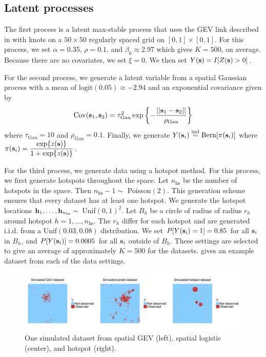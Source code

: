 \subsection{Latent processes} \label{rbs:simsettings}
The first process is a latent max-stable process that uses the GEV link described in  with knots on a $50 \times 50$ regularly spaced grid on $[0, 1] \times [0, 1]$.
For this process, we set $\alpha = 0.35$, $\rho = 0.1$, and $\beta_0 \approx 2.97$ which gives $K = 500$, on average.
Because there are no covariates, we set $\xi = 0$.
We then set $Y(\mathbf{s}) = I[Z(\mathbf{s}) > 0]$.

For the second process, we generate a latent variable from a spatial Gaussian process with a mean of $\text{logit}(0.05) \approx -2.94$ and an exponential covariance given by
\begin{align}
  \text{Cov}(\mathbf{s}_1, \mathbf{s}_2) = \tau_\text{Gau}^2 \exp\left\{- \frac{||\mathbf{s}_1 - \mathbf{s}_2||}{\rho_\text{Gau}}\right\}
\end{align}
where $\tau_\text{Gau} = 10$ and $\rho_\text{Gau} = 0.1$.
Finally, we generate $Y(\mathbf{s}_i) \stackrel{\mathrm{ind}}{\sim} \text{Bern}[\pi(\mathbf{s}_i)]$
where $\pi(\mathbf{s}_i) = \displaystyle \frac{ \exp\{z(\mathbf{s})\}}{1 + \exp\{z(\mathbf{s})\} }$.

For the third process, we generate data using a hotspot method.
For this process, we first generate hotspots throughout the space.
Let $n_\text{hs}$ be the number of hotspots in the space.
Then $n_\text{hs} - 1 \sim$ Poisson$(2)$.
This generation scheme ensures that every dataset has at least one hotspot.
We generate the hotspot locations $\mathbf{h}_1, \ldots, \mathbf{h}_{n_\text{hs}} \sim$ Unif$(0, 1)^2$.
Let $B_h$ be a circle of radius of radius $r_h$ around hotspot $h = 1, \ldots, n_\text{hs}$.
The $r_h$ differ for each hotspot and are generated i.i.d. from a Unif$(0.03, 0.08)$ distribution.
We set $P[Y(\mathbf{s}_i) = 1] = 0.85$ for all $\mathbf{s}_i$ in $B_h$, and $P[Y(\mathbf{s}_i)] = 0.0005$ for all $\mathbf{s}_i$ outside of $B_h$.
These settings are selected to give an average of approximately $K = 500$ for the datasets.
 gives an example dataset from each of the data settings.

\begin{figure}
  \centering
  \includegraphics[width=\linewidth, trim={0em, 1em, 0em, 1em}]{plots/simulateddata}
  \caption{One simulated dataset from spatial GEV (left), spatial logistic (center), and hotspot (right).}
  \label{rbfig:simulateddata}
\end{figure}

